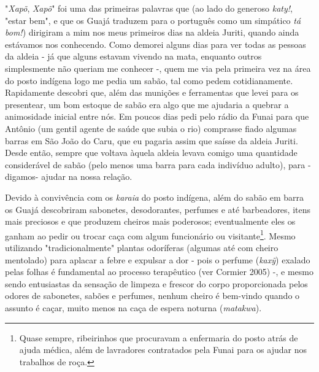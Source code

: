 "\emph{Xapõ}, \emph{Xapõ}" foi uma das primeiras palavras que (ao lado
do generoso \emph{katy!}, "estar bem", e que os Guajá traduzem para o
português como um simpático \emph{tá} \emph{bom!}) dirigiram a mim nos
meus primeiros dias na aldeia Juriti, quando ainda estávamos nos
conhecendo. Como demorei alguns dias para ver todas as pessoas da aldeia
- já que alguns estavam vivendo na mata, enquanto outros simplesmente
não queriam me conhecer -, quem me via pela primeira vez na área do
posto indígena logo me pedia um sabão, tal como pedem cotidianamente.
Rapidamente descobri que, além das munições e ferramentas que levei para
os presentear, um bom estoque de sabão era algo que me ajudaria a
quebrar a animosidade inicial entre nós. Em poucos dias pedi pelo rádio
da Funai para que Antônio (um gentil agente de saúde que subia o rio)
comprasse fiado algumas barras em São João do Caru, que eu pagaria assim
que saísse da aldeia Juriti. Desde então, sempre que voltava àquela
aldeia levava comigo uma quantidade considerável de sabão (pelo menos
uma barra para cada indivíduo adulto), para - digamos- ajudar na nossa
relação.

Devido à convivência com os \emph{karaia} do posto indígena, além do
sabão em barra os Guajá descobriram sabonetes, desodorantes, perfumes e
até barbeadores, itens mais preciosos e que produzem cheiros mais
poderosos; eventualmente eles os ganham ao pedir ou trocar caça com
algum funcionário ou visitante\footnote{Quase sempre, ribeirinhos que
  procuravam a enfermaria do posto atrás de ajuda médica, além de
  lavradores contratados pela Funai para os ajudar nos trabalhos de
  roça.}. Mesmo utilizando "tradicionalmente" plantas odoríferas
(algumas até com cheiro mentolado) para aplacar a febre e expulsar a dor
- pois o perfume (\emph{kaxỹ}) exalado pelas folhas é fundamental ao
processo terapêutico (ver Cormier 2005) -, e mesmo sendo entusiastas da
sensação de limpeza e frescor do corpo proporcionada pelos odores de
sabonetes, sabões e perfumes, nenhum cheiro é bem-vindo quando o assunto
é caçar, muito menos na caça de espera noturna (\emph{matakwa}).

